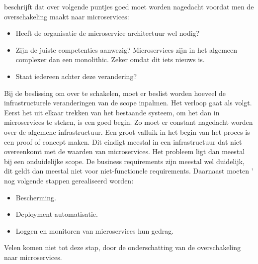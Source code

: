 \textcite{Benetis2016a} beschrijft dat over volgende puntjes goed moet worden nagedacht voordat men de overschakeling maakt naar microservices:
\begin{itemize}
	\item Heeft de organisatie de microservice architectuur  wel nodig?
	\item Zijn de juiste competenties aanwezig? Microservices zijn in het algemeen complexer dan een monolithic. Zeker omdat dit iets nieuws is. 
	\item  Staat iedereen achter deze verandering?
\end{itemize}
Bij de beslissing om over te schakelen, moet er beslist worden hoeveel de infrastructurele veranderingen van de scope inpalmen. Het verloop gaat als volgt. Eerst het uit elkaar trekken van het bestaande systeem, om het dan in microservices te steken, is een goed begin. Zo moet er constant nagedacht worden over de algemene infrastructuur. Een groot valluik in het begin van het proces is een proof of concept maken. Dit eindigt meestal in een infrastructuur dat niet overeenkomt met de waarden van microservices. Het probleem ligt dan meestal bij een onduidelijke scope. De business requirements zijn meestal  wel duidelijk, dit geldt dan meestal niet voor niet-functionele requirements. Daarnaast moeten ' nog volgende stappen gerealiseerd worden:
\begin{itemize}
	\item Bescherming.
	\item Deployment automatisatie.
	\item Loggen en monitoren van microservices hun gedrag.
\end{itemize}
Velen komen niet tot deze stap, door de onderschatting van de overschakeling naar microservices.


